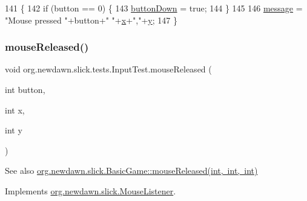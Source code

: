 \begin{DoxyCode}
141                                                        \{
142         \textcolor{keywordflow}{if} (button == 0) \{
143             \mbox{\hyperlink{classorg_1_1newdawn_1_1slick_1_1tests_1_1_input_test_aaa3058a9f1d4a84c36dfc06c5e43944b}{buttonDown}} = \textcolor{keyword}{true};
144         \}
145         
146         \mbox{\hyperlink{classorg_1_1newdawn_1_1slick_1_1tests_1_1_input_test_a998b4c1fcea34c27835b531bd6afa539}{message}} = \textcolor{stringliteral}{"Mouse pressed "}+button+\textcolor{stringliteral}{" "}+\mbox{\hyperlink{classorg_1_1newdawn_1_1slick_1_1tests_1_1_input_test_a95f99c94f1e661a629501a3205d78c15}{x}}+\textcolor{stringliteral}{","}+\mbox{\hyperlink{classorg_1_1newdawn_1_1slick_1_1tests_1_1_input_test_a18ce34ad5ddc268a0420c747d5b19d05}{y}};
147     \}
\end{DoxyCode}
\mbox{\label{classorg_1_1newdawn_1_1slick_1_1tests_1_1_input_test_a72286bb4e1e168926a47732f055eeab0}} 
\subsubsection{\texorpdfstring{mouse\+Released()}{mouseReleased()}}
{\footnotesize\ttfamily void org.\+newdawn.\+slick.\+tests.\+Input\+Test.\+mouse\+Released (\begin{DoxyParamCaption}\item[{int}]{button,  }\item[{int}]{x,  }\item[{int}]{y }\end{DoxyParamCaption})\hspace{0.3cm}{\ttfamily [inline]}}

\begin{DoxySeeAlso}{See also}
\mbox{\hyperlink{classorg_1_1newdawn_1_1slick_1_1_basic_game_ad5f3b68d103dc42613e5a35c7f820f72}{org.\+newdawn.\+slick.\+Basic\+Game\+::mouse\+Released(int, int, int)}} 
\end{DoxySeeAlso}


Implements \mbox{\hyperlink{interfaceorg_1_1newdawn_1_1slick_1_1_mouse_listener_a8d1606869f610664f9299565067d5571}{org.\+newdawn.\+slick.\+Mouse\+Listener}}.


